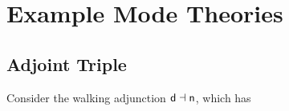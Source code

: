 \documentclass{drl-common/llncs}
\renewcommand{\sem}[1]{\ensuremath{ \llbracket #1 \rrbracket}}
\newcommand{\inv}[1]{\ensuremath{{#1}^{-1}}}
\newcommand{\la}{\ensuremath{\dashv}}
\newcommand\coprd[2]{\ensuremath{#1 + #2}}
\newcommand\seq[3]{\ensuremath{#1 \, [ #2 ] \, \vdash \, #3}}
\newcommand\ident[1]{\ensuremath{\dsd{ident}_{#1}}}
\newcommand\cutsym{\ensuremath{\dsd{cut}}}
\newcommand\cut[2]{\ensuremath{{\cutsym \,\, #1 \,\, #2}}}
\newcommand\Inl[1]{\ensuremath{\dsd{Inl}(#1)}}
\newcommand\Inr[1]{\ensuremath{\dsd{Inr}(#1)}}
\newcommand\Case[2]{\ensuremath{\dsd{Case}(#1,#2)}}
\newcommand\UL[3]{\ensuremath{\dsd{UL}^{#1}_{#2}(#3)}}
\newcommand\ap[2]{\ensuremath{#1 \approx #2}}
\begin{document}



\section{Example Mode Theories}
\label{sec:triple}

\subsection{Adjoint Triple}

Consider the walking adjunction $\dsd d \la \dsd n$, which has
\end{document}

